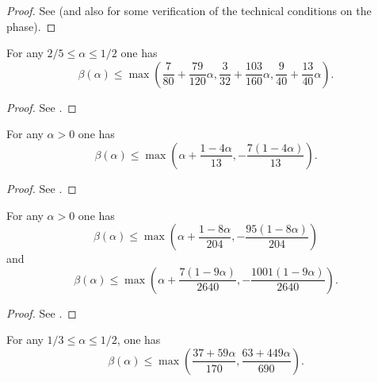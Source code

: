 \begin{proof} See \cite[Table 17.1, Table 19.2]{huxley_area_1996} (and also \cite[\S 3.0.2, 3.0.3]{trudgian-yang} for some verification of the technical conditions on the phase).
\end{proof}


    \begin{theorem}\label{beta-HK}  For any $2/5 \le \alpha \le 1/2$ one has
        $$ \beta(\alpha) \leq \max\left(\frac{7}{80} + \frac{79}{120}\alpha, \frac{3}{32} + \frac{103}{160}\alpha, \frac{9}{40} + \frac{13}{40}\alpha\right).$$
    \end{theorem}

\literature
{}

    \begin{proof}
    See \cite[Theorem~1]{huxley_exponential_2001}.
    \end{proof}


\begin{theorem}\label{beta-RS}  For any $\alpha > 0$ one has
    $$ \beta(\alpha) \leq \max\left( \alpha + \frac{1-4\alpha}{13}, -\frac{7(1-4\alpha)}{13}\right).$$
\end{theorem}

\literature
{}

\begin{proof}
See \cite[Theorem~1]{robert_fourth_2002}.
\end{proof}


\begin{theorem}\label{sargos-bound}  For any $\alpha > 0$ one has
$$ \beta(\alpha) \leq \max\left( \alpha + \frac{1-8\alpha}{204}, -\frac{95(1-8\alpha)}{204}\right)$$
and
$$ \beta(\alpha) \leq \max\left( \alpha + \frac{7(1-9\alpha)}{2640}, -\frac{1001(1-9\alpha)}{2640}\right).$$
\end{theorem}

\literature
{}

\begin{proof}
See \cite[Theorems~3, 4]{sargos_analog_2003}.
\end{proof}


\begin{theorem}\label{beta-Huxley-5} For any $1/3 \le \alpha \le 1/2$, one has
\[
\beta(\alpha) \le \max\left(\frac{37 + 59\alpha}{170}, \frac{63 + 449\alpha}{690}\right).
\]
\end{theorem}

